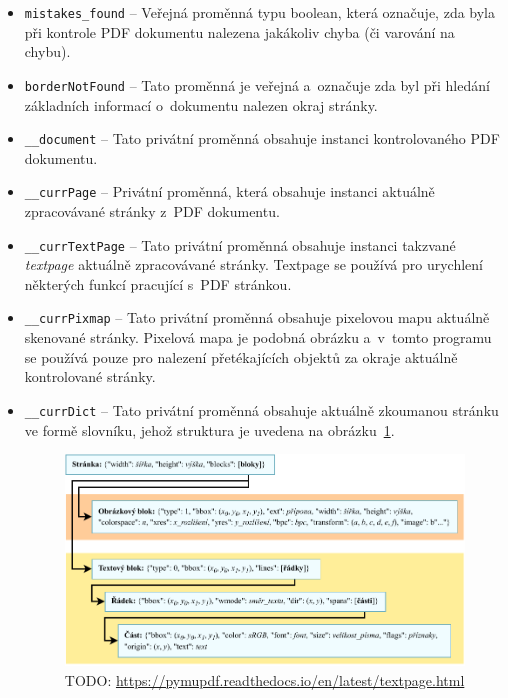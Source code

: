 \begin{itemize}
    \item \texttt{mistakes\_found} -- Veřejná proměnná typu boolean, která označuje,
    zda byla při kontrole PDF dokumentu nalezena jakákoliv chyba (či varování
    na chybu).

    \item \texttt{borderNotFound} -- Tato proměnná je veřejná a~označuje zda byl
    při hledání základních informací o~dokumentu nalezen okraj stránky. 

    \item \texttt{\_\_document} -- Tato privátní proměnná obsahuje instanci
    kontrolovaného PDF dokumentu.

    \item \texttt{\_\_currPage} -- Privátní proměnná, která obsahuje instanci
    aktuálně zpracovávané stránky z~PDF dokumentu.
    
    \item \texttt{\_\_currTextPage} -- Tato privátní proměnná obsahuje instanci
    takzvané \emph{textpage} aktuálně zpracovávané stránky. Textpage se používá
    pro urychlení některých funkcí pracující s~PDF stránkou.
    
    \item \texttt{\_\_currPixmap} -- Tato privátní proměnná obsahuje pixelovou
    mapu aktuálně skenované stránky. Pixelová mapa je podobná obrázku a~v~tomto
    programu se používá pouze pro nalezení přetékajících objektů za okraje
    aktuálně kontrolované stránky.
    
    \item \texttt{\_\_currDict} -- Tato privátní proměnná obsahuje aktuálně
    zkoumanou stránku ve formě slovníku, jehož struktura je uvedena na
    obrázku~\ref{pic_curr_page_dict}.
    \begin{figure}[H]
        \label{pic_curr_page_dict}
        \centering
        \includegraphics[width=\linewidth]{obrazky-figures/page_dictionary.pdf}
        \caption{TODO: \url{https://pymupdf.readthedocs.io/en/latest/textpage.html}}
    \end{figure}
    

\end{itemize}

